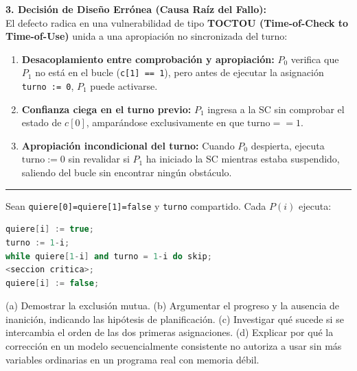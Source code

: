 \documentclass[11pt,a4paper,twoside,openright]{report}
\begin{document}
\begin{solucion}
\textbf{3. Decisión de Diseño Errónea (Causa Raíz del Fallo):}\\
El defecto radica en una vulnerabilidad de tipo \textbf{TOCTOU (Time-of-Check to Time-of-Use)} unida a una apropiación no sincronizada del turno:
\begin{enumerate}[leftmargin=*]
    \item \textbf{Desacoplamiento entre comprobación y apropiación:} $P_0$ verifica que $P_1$ no está en el bucle (\texttt{c[1] == 1}), pero antes de ejecutar la asignación \texttt{turno := 0}, $P_1$ puede activarse.
    \item \textbf{Confianza ciega en el turno previo:} $P_1$ ingresa a la SC sin comprobar el estado de $c[0]$, amparándose exclusivamente en que $\text{turno} == 1$.
    \item \textbf{Apropiación incondicional del turno:} Cuando $P_0$ despierta, ejecuta $\text{turno} := 0$ sin revalidar si $P_1$ ha iniciado la SC mientras estaba suspendido, saliendo del bucle sin encontrar ningún obstáculo.
\end{enumerate}
\end{solucion}

\vspace{15pt}
\hrule
\vspace{15pt}

\begin{ejercicio}
Sean \texttt{quiere[0]=quiere[1]=false} y \texttt{turno} compartido. Cada $P(i)$ ejecuta:
\begin{lstlisting}[language=C++]
quiere[i] := true;
turno := 1-i;
while quiere[1-i] and turno = 1-i do skip;
<seccion critica>;
quiere[i] := false;
\end{lstlisting}
(a) Demostrar la exclusión mutua. (b) Argumentar el progreso y la ausencia de inanición, indicando las hipótesis de planificación. (c) Investigar qué sucede si se intercambia el orden de las dos primeras asignaciones. (d) Explicar por qué la corrección en un modelo secuencialmente consistente no autoriza a usar sin más variables ordinarias en un programa real con memoria débil.
\end{ejercicio}
\end{document}
